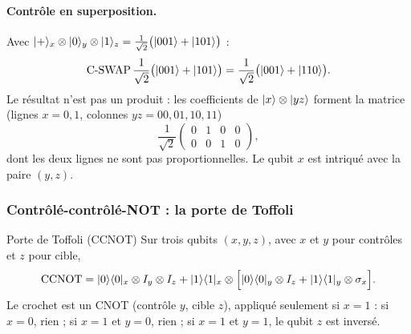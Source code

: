 \paragraph{Contrôle en superposition.} Avec $|+\rangle_x\otimes|0\rangle_y\otimes|1\rangle_z
=\frac{1}{\sqrt2}\big(|001\rangle+|101\rangle\big)$ :
\[
  \mathrm{C\text{-}SWAP}\,\frac{1}{\sqrt2}\big(|001\rangle+|101\rangle\big)
  =\frac{1}{\sqrt2}\big(|001\rangle+|110\rangle\big).
\]
Le résultat n'est pas un produit : les coefficients de $|x\rangle\otimes|yz\rangle$ forment la
matrice (lignes $x=0,1$, colonnes $yz=00,01,10,11$)
\[
  \frac{1}{\sqrt2}\begin{pmatrix}0&1&0&0\\0&0&1&0\end{pmatrix},
\]
dont les deux lignes ne sont pas proportionnelles. Le qubit $x$ est intriqué avec la paire
$(y,z)$.

\subsubsection{Contrôlé-contrôlé-NOT : la porte de Toffoli}

\begin{definition}{Porte de Toffoli (CCNOT)}
Sur trois qubits $(x,y,z)$, avec $x$ et $y$ pour contrôles et $z$ pour cible,
\[
  \mathrm{CCNOT}=|0\rangle\langle 0|_x\otimes I_y\otimes I_z
   +|1\rangle\langle 1|_x\otimes\Big[|0\rangle\langle 0|_y\otimes I_z+|1\rangle\langle 1|_y\otimes\sigma_x\Big].
\]
Le crochet est un CNOT (contrôle $y$, cible $z$), appliqué seulement si $x=1$ : si $x=0$, rien ;
si $x=1$ et $y=0$, rien ; si $x=1$ et $y=1$, le qubit $z$ est inversé.
\end{definition}

